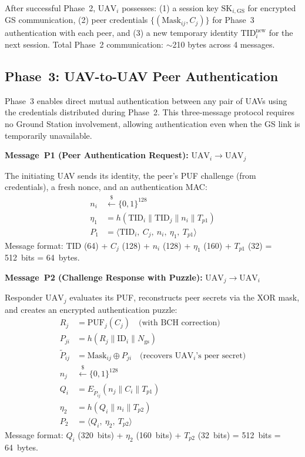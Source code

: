 \documentclass[11pt,a4paper]{article}
\begin{document}
After successful Phase~2, $\text{UAV}_i$ possesses: (1) a session key $\text{SK}_{i,\text{GS}}$ for encrypted GS communication, (2) peer credentials $\{(\text{Mask}_{ij}, C_j)\}$ for Phase~3 authentication with each peer, and (3) a new temporary identity $\text{TID}_i^{\text{new}}$ for the next session. Total Phase~2 communication: $\sim$210 bytes across 4 messages.

\subsection{Phase~3: UAV-to-UAV Peer Authentication}

Phase~3 enables direct mutual authentication between any pair of UAVs using the credentials distributed during Phase~2. This three-message protocol requires no Ground Station involvement, allowing authentication even when the GS link is temporarily unavailable.

\textbf{Message~P1 (Peer Authentication Request):} $\text{UAV}_i \rightarrow \text{UAV}_j$

The initiating UAV sends its identity, the peer's PUF challenge (from credentials), a fresh nonce, and an authentication MAC:
\begin{align}
n_i &\xleftarrow{\$} \{0,1\}^{128} \\
\eta_1 &= h(\text{TID}_i \| \text{TID}_j \| n_i \| T_{p1}) \\
P_1 &= \langle \text{TID}_i,\ C_j,\ n_i,\ \eta_1,\ T_{p1} \rangle
\end{align}
Message format: TID (64) + $C_j$ (128) + $n_i$ (128) + $\eta_1$ (160) + $T_{p1}$ (32) = 512~bits = 64~bytes.

\textbf{Message~P2 (Challenge Response with Puzzle):} $\text{UAV}_j \rightarrow \text{UAV}_i$

Responder $\text{UAV}_j$ evaluates its PUF, reconstructs peer secrets via the XOR mask, and creates an encrypted authentication puzzle:
\begin{align}
R_j &= \text{PUF}_j(C_j) \quad \text{(with BCH correction)} \\
P_{ji} &= h(R_j \| \text{ID}_i \| N_{\text{gs}}) \\
\tilde{P}_{ij} &= \text{Mask}_{ij} \oplus P_{ji} \quad \text{(recovers } \text{UAV}_i\text{'s peer secret)} \\
n_j &\xleftarrow{\$} \{0,1\}^{128} \\
Q_i &= E_{\tilde{P}_{ij}}(n_j \| C_i \| T_{p1}) \\
\eta_2 &= h(Q_i \| n_i \| T_{p2}) \\
P_2 &= \langle Q_i,\ \eta_2,\ T_{p2} \rangle
\end{align}
Message format: $Q_i$ (320~bits) + $\eta_2$ (160~bits) + $T_{p2}$ (32~bits) = 512~bits = 64~bytes.
\end{document}
